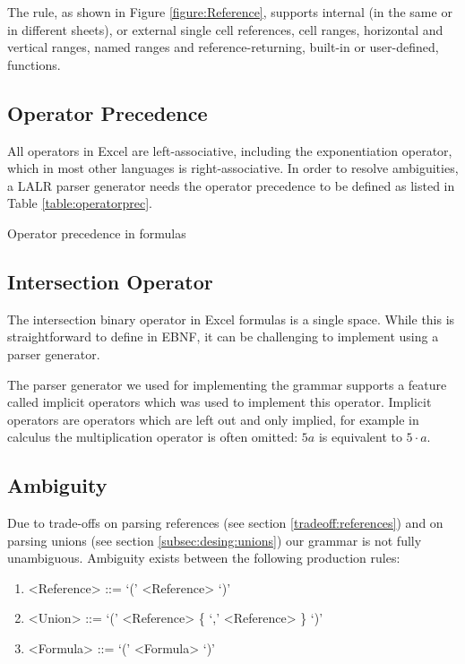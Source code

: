 \documentclass[times]{smrauth}
\begin{document}
The  rule, as shown in Figure \ref{figure:Reference}, supports internal (in the same or in different sheets), or external single cell references, cell ranges, horizontal and vertical ranges, named ranges and reference-returning, built-in or user-defined, functions.

\subsection{Operator Precedence}
\label{sec:operatorprecedence}

All operators in Excel are left-associative, including the exponentiation operator, which in most other languages is right-associative.
In order to resolve ambiguities, a LALR parser generator needs the operator precedence to be defined as listed in Table \ref{table:operatorprec}.

\begin{table}[]
	\centering
	\caption{Operator precedence in formulas}
	\label{table:operatorprec}
	
\end{table}

\subsection{Intersection Operator}

The intersection binary operator in Excel formulas is a single space.
While this is straightforward to define in EBNF, it can be challenging to implement using a parser generator.

The parser generator we used for implementing the grammar supports a feature called implicit operators which was used to implement this operator.
Implicit operators are operators which are left out and only implied, for example in calculus the multiplication operator is often omitted: $5a$ is equivalent to $5 \cdot a$.

\subsection{Ambiguity}
\label{sec:ambiguity}

Due to trade-offs on parsing references (see section \ref{tradeoff:references}) and on parsing unions (see section \ref{subsec:desing:unions}) our grammar is not fully unambiguous.
Ambiguity exists between the following production rules:
\begin{enumerate}
	\item \begin{grammar}<Reference> ::= `(' <Reference> `)'\end{grammar}
	\item \begin{grammar}<Union> ::= `(' <Reference> \{ `,' <Reference> \} `)'\end{grammar}
	\item \begin{grammar}<Formula> ::= `(' <Formula> `)'\end{grammar}
\end{enumerate}
\end{document}
